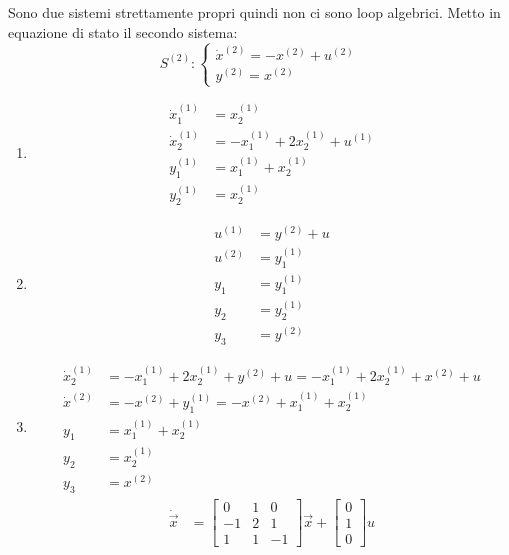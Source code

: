 \documentclass[../main.tex]{subfiles}
\begin{document}
\begin{mdframed}[style=Exercise]
\begin{Exercise}[title={Studiare propriet\'a di sistemi interconnessi}, difficulty=3]
				Sono due sistemi strettamente propri quindi non ci sono loop algebrici. Metto in equazione di stato il secondo sistema:
				\[
					S^{(2)}:
					\begin{cases}
						\dot x^{(2)} = -x^{(2)} + u^{(2)}\\
						y^{(2)} = x^{(2)}
					\end{cases}
				\]
				\begin{enumerate}
					\item 
						\begin{align*}
							\dot x^{(1)}_1 &= x^{(1)}_2\\
							\dot x^{(1)}_2 &= -x^{(1)}_1 + 2x^{(1)}_2 + u^{(1)}\\
							y^{(1)}_1 &= x^{(1)}_1 + x^{(1)}_2\\
							y^{(1)}_2 &= x^{(1)}_2
						\end{align*}
					\item 
						\begin{align*}
							u^{(1)} &= y^{(2)} + u\\
							u^{(2)} &= y^{(1)}_1\\
							y_1 &= y^{(1)}_1\\
							y_2 &= y^{(1)}_2\\
							y_3 &= y^{(2)}
						\end{align*}
					\item 
						\begin{align*}
							\dot x^{(1)}_2 &= -x^{(1)}_1 + 2x^{(1)}_2 + y^{(2)} + u = -x^{(1)}_1 + 2x^{(1)}_2 + x^{(2)} + u\\
							\dot x^{(2)} &= -x^{(2)} + y^{(1)}_1 = -x^{(2)} + x^{(1)}_1 + x^{(1)}_2\\
							y_1 &= x^{(1)}_1 + x^{(1)}_2\\
							y_2 &= x^{(1)}_2\\
							y_3 &= x^{(2)}
						\end{align*}
						\[
							\begin{aligned}
								\dot{\vec x} &= 
								\begin{bmatrix}
									0 & 1 & 0\\
									-1 & 2 & 1\\
									1 & 1 & -1
								\end{bmatrix} \vec x+
								\begin{bmatrix}
									0\\
									1\\
									0
								\end{bmatrix} u
								\\

\end{aligned}\]
\end{enumerate}
\end{Exercise}
\end{mdframed}
\end{document}
